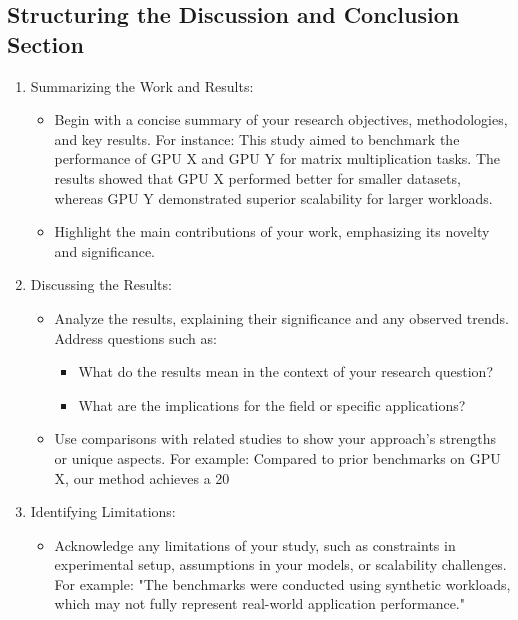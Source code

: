 \documentclass[conference]{IEEEtran}
\begin{document}
\subsection{Structuring the Discussion and Conclusion Section}
\begin{enumerate}
\item Summarizing the Work and Results:  
\begin{itemize}
   \item Begin with a concise summary of your research objectives, methodologies, and key results. For instance: This study aimed to benchmark the performance of GPU X and GPU Y for matrix multiplication tasks. The results showed that GPU X performed better for smaller datasets, whereas GPU Y demonstrated superior scalability for larger workloads.  
   \item Highlight the main contributions of your work, emphasizing its novelty and significance.  
\end{itemize}

\item Discussing the Results:  
\begin{itemize}
   \item Analyze the results, explaining their significance and any observed trends. Address questions such as:  
\begin{itemize}
     \item What do the results mean in the context of your research question?  
     \item What are the implications for the field or specific applications?  
\end{itemize}
   \item Use comparisons with related studies to show your approach's strengths or unique aspects. For example: Compared to prior benchmarks on GPU X, our method achieves a 20%
\end{itemize}

\item Identifying Limitations:  
\begin{itemize}
   \item Acknowledge any limitations of your study, such as constraints in experimental setup, assumptions in your models, or scalability challenges. For example: "The benchmarks were conducted using synthetic workloads, which may not fully represent real-world application performance."  
\end{itemize}


\end{enumerate}
\end{document}
